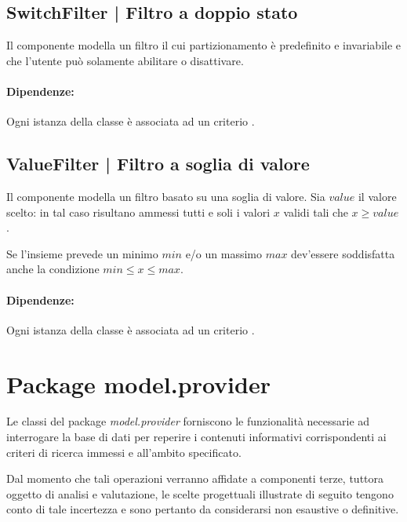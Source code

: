 \documentclass[10pt,a4paper,headinclude,footinclude,hidelinks]{scrreprt} %
\begin{document}
	\subsection[SwitchFilter]{SwitchFilter | Filtro a doppio stato}
	\label{sec:stage:design:sistema:model.filter:switch-filter}
	Il componente modella un filtro il cui partizionamento è predefinito e invariabile e che l'utente può solamente abilitare o disattivare.

	\paragraph{Dipendenze:} Ogni istanza della classe \textit{} è associata ad un criterio \textit{}.

	\subsection[ValueFilter]{ValueFilter | Filtro a soglia di valore}
	\label{sec:stage:design:sistema:model.filter:value-filter}
	Il componente modella un filtro basato su una soglia di valore. Sia $value$ il valore scelto: in tal caso risultano ammessi tutti e soli i valori $x$ validi tali che $x \geq value$.

	Se l'insieme prevede un minimo $min$ e/o un massimo $max$ dev'essere soddisfatta anche la condizione $min \leq x \leq max$.

	\paragraph{Dipendenze:} Ogni istanza della classe \textit{} è associata ad un criterio \textit{}.

	\section{Package model.provider}
	\label{sec:stage:design:sistema:model.provider}
	Le classi del package \textit{model.provider} forniscono le funzionalità necessarie ad interrogare la base di dati per reperire i contenuti informativi corrispondenti ai criteri di ricerca immessi e all'ambito specificato.

	Dal momento che tali operazioni verranno affidate a componenti terze, tuttora oggetto di analisi e valutazione, le scelte progettuali illustrate di seguito tengono conto di tale incertezza e sono pertanto da considerarsi non esaustive o definitive.
\end{document}
